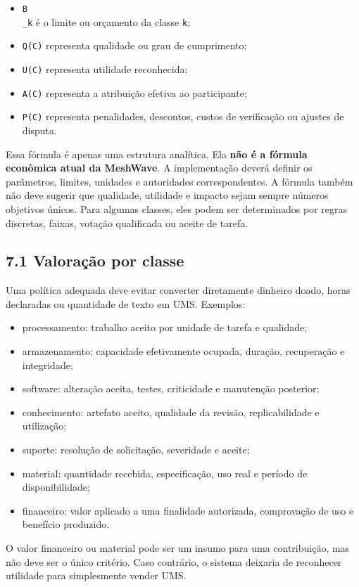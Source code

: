 \documentclass[12pt,a4paper]{article}
\begin{document}
\begin{itemize}
\item \texttt{B\\_k} é o limite ou orçamento da classe \texttt{k};
\item \texttt{Q(C)} representa qualidade ou grau de cumprimento;
\item \texttt{U(C)} representa utilidade reconhecida;
\item \texttt{A(C)} representa a atribuição efetiva ao participante;
\item \texttt{P(C)} representa penalidades, descontos, custos de verificação ou ajustes de disputa.

\end{itemize}
Essa fórmula é apenas uma estrutura analítica. Ela \textbf{não é a fórmula econômica atual da MeshWave}. A implementação deverá definir os parâmetros, limites, unidades e autoridades correspondentes. A fórmula também não deve sugerir que qualidade, utilidade e impacto sejam sempre números objetivos únicos. Para algumas classes, eles podem ser determinados por regras discretas, faixas, votação qualificada ou aceite de tarefa.\\

\subsection{7.1 Valoração por classe}

Uma política adequada deve evitar converter diretamente dinheiro doado, horas declaradas ou quantidade de texto em UMS. Exemplos:\\

\begin{itemize}
\item processamento: trabalho aceito por unidade de tarefa e qualidade;
\item armazenamento: capacidade efetivamente ocupada, duração, recuperação e integridade;
\item software: alteração aceita, testes, criticidade e manutenção posterior;
\item conhecimento: artefato aceito, qualidade da revisão, replicabilidade e utilização;
\item suporte: resolução de solicitação, severidade e aceite;
\item material: quantidade recebida, especificação, uso real e período de disponibilidade;
\item financeiro: valor aplicado a uma finalidade autorizada, comprovação de uso e benefício produzido.

\end{itemize}
O valor financeiro ou material pode ser um insumo para uma contribuição, mas não deve ser o único critério. Caso contrário, o sistema deixaria de reconhecer utilidade para simplesmente vender UMS.\\
\end{document}
